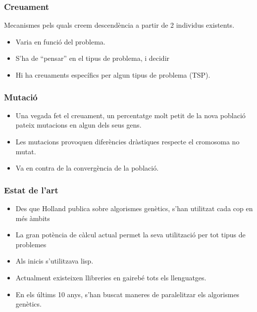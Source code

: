 \documentclass{beamer}
\begin{document}

\begin{frame}
	\frametitle{Creuament}
	\begin{block}{}
		Mecanismes pels quals creem descendència a partir de 2 individus
		existents.
	\end{block}
		\begin{itemize}
			\item Varia en funció del problema. %
			\item S'ha de ``pensar'' en el tipus de problema, i decidir
			\item Hi ha creuaments específics per algun tipus de problema (TSP).
		\end{itemize}
\end{frame}


\begin{frame}
	\frametitle{Mutació}
		\begin{itemize}
			\item Una vegada fet el creuament, un percentatge molt petit de la nova
			població pateix mutacions en algun dels seus gens.
			\item Les mutacions provoquen diferències dràstiques respecte el
			cromosoma no mutat.
			\item Va en contra de la convergència de la població.
		\end{itemize}
\end{frame}


\begin{frame}
\frametitle{Estat de l'art}
\begin{itemize}
\item Des que Holland publica sobre algorismes genètics, s'han utilitzat cada
cop en més àmbits
\item La gran potència de càlcul actual permet la seva utilització per tot tipus
de problemes
\pause
\item Als inicis s'utilitzava lisp.
\item Actualment existeixen llibreries en gairebé tots els llenguatges.
\item En els últims 10 anys, s'han buscat maneres de paralelitzar els algorismes
genètics.
\end{itemize}
\end{frame}

\end{document}
